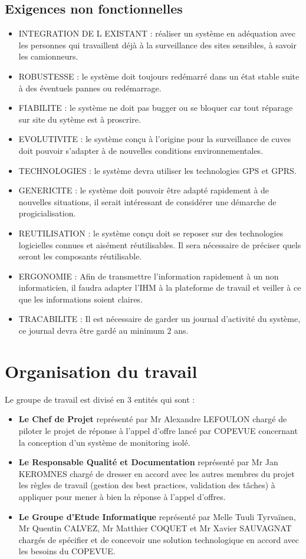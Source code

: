     \subsection{Exigences non fonctionnelles}
\begin{itemize}
\item INTEGRATION DE L EXISTANT : réaliser un système en adéquation avec les personnes qui travaillent déjà à la surveillance des sites sensibles, à savoir les camionneurs.
\item ROBUSTESSE : le système doit toujours redémarré dans un état stable suite à des éventuels pannes ou redémarrage.
\item FIABILITE : le système ne doit pas bugger ou se bloquer car tout réparage sur site du sytème est à proscrire.
\item EVOLUTIVITE : le système conçu à l'origine pour la surveillance de cuves doit pouvoir s'adapter à de nouvelles conditions environnementales.
\item TECHNOLOGIES : le système devra utiliser les technologies GPS et GPRS.
\item GENERICITE : le système doit pouvoir être adapté rapidement à de nouvelles situations, il serait intéressant de considérer une démarche de progicialisation.
\item REUTILISATION : le système conçu doit se reposer sur des technologies logicielles connues et aisément réutilisables. Il sera nécessaire de préciser quels seront les composants réutilisable.
\item ERGONOMIE : Afin de transmettre l'information rapidement à un non informaticien, il faudra adapter l'IHM à la plateforme de travail et veiller à ce que les informations soient claires.
\item TRACABILITE : Il est nécessaire de garder un journal d'activité du système, ce journal devra être gardé au minimum 2 ans.
\end{itemize}
   
\section{Organisation du travail}
Le groupe de travail est divisé en 3 entités qui sont :
\begin{itemize}
\item \textbf{Le Chef de Projet} représenté par Mr Alexandre LEFOULON chargé de piloter le projet de réponse à l'appel d'offre lancé par COPEVUE concernant la conception d'un système de monitoring isolé.
\item \textbf{Le Responsable Qualité et Documentation} représenté par Mr Jan KEROMNES chargé de dresser en accord avec les autres membres du projet les règles de travail (gestion des best practices, validation des tâches) à appliquer pour mener à bien la réponse à l'appel d'offres.
\item \textbf{Le Groupe d'Etude Informatique} représenté par Melle Tuuli Tyrvaïnen, Mr Quentin CALVEZ, Mr Matthier COQUET et Mr Xavier SAUVAGNAT chargés de spécifier et de concevoir une solution technologique en accord avec les besoins du COPEVUE.
\end{itemize}

